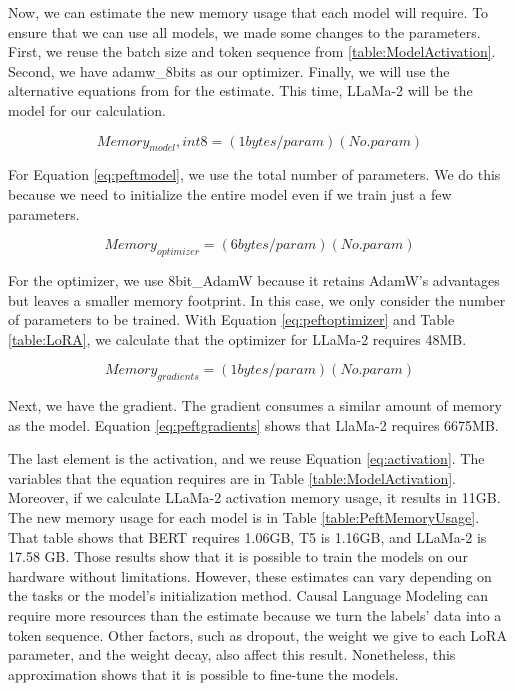Now, we can estimate the new memory usage that each model will require. To ensure that we can use all models, we made some changes to the parameters. First, we reuse the batch size and token sequence from \ref{table:ModelActivation}. Second, we have adamw\_8bits as our optimizer. Finally, we will use the alternative equations from \cite{transformer-math-eleutherai} for the estimate. This time, LLaMa-2 will be the model for our calculation.

\[ Memory_{model}, int8 = (1 bytes/param) (No. param) \label{eq:peftmodel} \tag{7} \] 

For Equation \ref{eq:peftmodel}, we use the total number of parameters. We do this because we need to initialize the entire model even if we train just a few parameters.


\[ Memory_{optimizer} = (6 bytes/param) (No. param) \label{eq:peftoptimizer} \tag{8} \] 

For the optimizer, we use 8bit\_AdamW because it retains AdamW's advantages but leaves a smaller memory footprint. In this case, we only consider the number of parameters to be trained. With Equation \ref{eq:peftoptimizer} and Table \ref{table:LoRA}, we calculate that the optimizer for LLaMa-2 requires 48MB.


\[ Memory_{gradients} = (1 bytes/param) (No. param) \label{eq:peftgradients} \tag{9} \] 

Next, we have the gradient. The gradient consumes a similar amount of memory as the model. Equation \ref{eq:peftgradients} shows that LlaMa-2 requires 6675MB.


The last element is the activation, and we reuse Equation \ref{eq:activation}. The variables that the equation requires are in Table \ref{table:ModelActivation}. Moreover, if we calculate LLaMa-2 activation memory usage, it results in 11GB. The new memory usage for each model is in Table \ref{table:PeftMemoryUsage}. That table shows that BERT requires 1.06GB, T5 is 1.16GB, and LLaMa-2 is 17.58 GB. Those results show that it is possible to train the models on our hardware without limitations. However, these estimates can vary depending on the tasks or the model's initialization method. Causal Language Modeling can require more resources than the estimate because we turn the labels' data into a token sequence. Other factors, such as dropout, the weight we give to each LoRA parameter, and the weight decay, also affect this result. Nonetheless, this approximation shows that it is possible to fine-tune the models.

